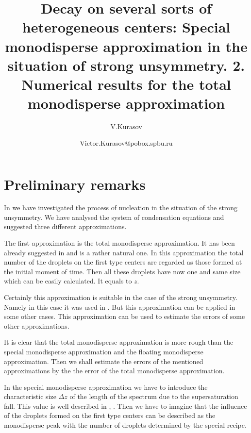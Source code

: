


\title{
Decay on several sorts of heterogeneous centers:
Special monodisperse approximation in the situation
of strong unsymmetry. 2. Numerical results for the total
monodisperse approximation}

\author{V.Kurasov}

\date{Victor.Kurasov@pobox.spbu.ru}



\maketitle

\section{Preliminary remarks}

In \cite{Section1} we have investigated the process of nucleation in the
situation of the strong unsymmetry.  We have analysed the system of
condensation
equations and suggested three different approximations.


The first approximation is the total monodisperse approximation. It has
been already suggested in \cite{Multidecay} and is a rather natural one.
In this approximation the total number of the droplets on the
first type centers are regarded as  those  formed  at  the  initial
moment
of time. Then all these droplets have now one and same size which can
be easily calculated. It equals to $z$.

Certainly this approximation is suitable in the case of the strong unsymmetry.
Namely in this case it was used in \cite{Multidecay}. But this approximation
can be applied in some other cases.
This approximation can be used  to estimate
the errors of some other approximations.

It is clear that the total monodisperse approximation is more rough than
the special monodisperse approximation and the floating monodisperse
approximation.
Then we shall estimate the errors of the mentioned approximations by the
the error of the total monodisperse approximation.

In the special monodisperse approximation we have to
introduce the characteristic  size $\Delta z$ of the length of the
spectrum due to the supersaturation fall. This value is well described
in \cite{Multidecay}, \cite{Section1}. Then we have to imagine that the
influence of the droplets formed on the first type centers can be described
as the monodisperse peak with the number of droplets determined by the
special recipe.

